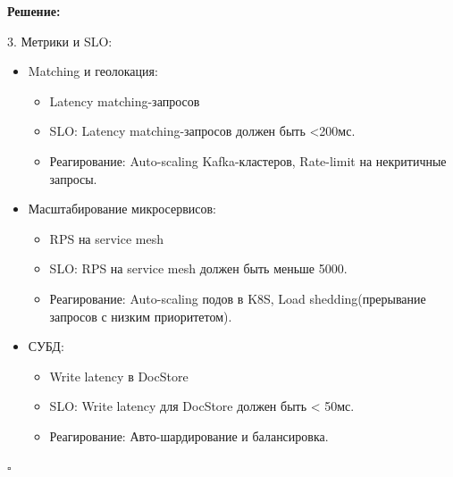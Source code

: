 \documentclass[12pt]{article}
\newenvironment{solution}
{
  \par\textbf{Решение:}\par\bigbreak
  \begingroup
}
{
  \par\bigbreak\hfill$\square$%
  \par\endgroup
}
\begin{document}
\begin{solution}
3. Метрики и SLO:
\begin{itemize}
	\item Matching и геолокация:
		\begin{itemize}
			\item Latency matching-запросов
			\item SLO: Latency matching-запросов должен быть <200мс.
			\item Реагирование: Auto-scaling Kafka-кластеров, Rate-limit на некритичные запросы.
		\end{itemize}
	\item Масштабирование микросервисов:
		\begin{itemize}
			\item RPS на service mesh
			\item SLO: RPS на service mesh должен быть меньше 5000.
			\item Реагирование: Auto-scaling подов в K8S, Load shedding(прерывание запросов с низким приоритетом).
		\end{itemize}
	\item СУБД:
		\begin{itemize}
			\item Write latency в DocStore
			\item SLO: Write latency для DocStore должен быть < 50мс.
			\item Реагирование: Авто-шардирование и балансировка.
		\end{itemize}
\end{itemize}

\end{solution} 
 
\end{document}
